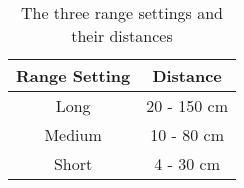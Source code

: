 \begin{table}[H]
\centering
\setlength\extrarowheight{3pt}
\begin{tabulary}{\textwidth}{|C|C|}
\hline
\textbf{Range Setting} & \textbf{Distance} \\
\hline
Long & 20 - 150 cm \\
\hline
Medium & 10 - 80 cm \\
\hline
Short & 4 - 30 cm \\
\hline
\end{tabulary}
\caption{The three range settings and their distances}
\label{mindsensorranges}
\end{table}
\FloatBarrier